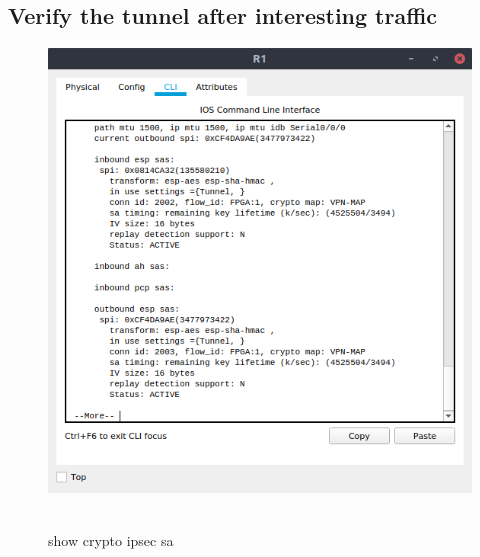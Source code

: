 \documentclass[12pt]{extarticle}
\begin{document}
\subsection{Verify the tunnel after interesting traffic}
\begin{center}
\begin{figure}[H]
\includegraphics[scale=0.7]{resources/q33.png}\
\caption{show crypto ipsec sa}
\end{figure}
\end{center}
\end{document}
